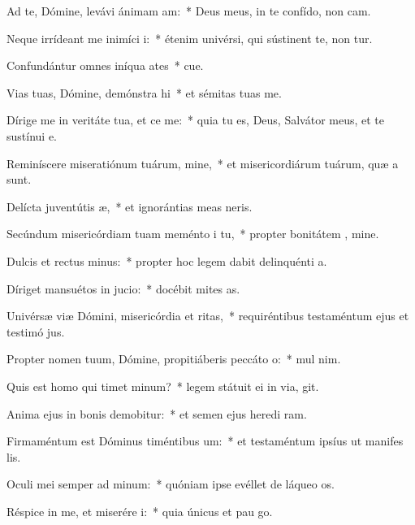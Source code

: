 \item Ad te, Dómine, levávi ánimam am:~* Deus meus, in te confído, non cam.
\item Neque irrídeant me inimíci i:~* étenim univérsi, qui sústinent te, non tur.
\item Confundántur omnes iníqua ates~* cue.
\item Vias tuas, Dómine, demónstra hi~* et sémitas tuas  me.
\item Dírige me in veritáte tua, et ce me:~* quia tu es, Deus, Salvátor meus, et te sustínui  e.
\item Reminíscere miseratiónum tuárum, mine,~* et misericordiárum tuárum, quæ a  sunt.
\item Delícta juventútis æ,~* et ignorántias meas  neris.
\item Secúndum misericórdiam tuam meménto i tu,~* propter bonitátem , mine.
\item Dulcis et rectus minus:~* propter hoc legem dabit delinquénti  a.
\item Díriget mansuétos in jucio:~* docébit mites  as.
\item Univérsæ viæ Dómini, misericórdia et ritas,~* requiréntibus testaméntum ejus et testimó jus.
\item Propter nomen tuum, Dómine, propitiáberis peccáto o:~* mul  nim.
\item Quis est homo qui timet minum?~* legem státuit ei in via,  git.
\item Anima ejus in bonis demobitur:~* et semen ejus heredi ram.
\item Firmaméntum est Dóminus timéntibus um:~* et testaméntum ipsíus ut manifes lis.
\item Oculi mei semper ad minum:~* quóniam ipse evéllet de láqueo  os.
\item Réspice in me, et miserére i:~* quia únicus et pau  go.

